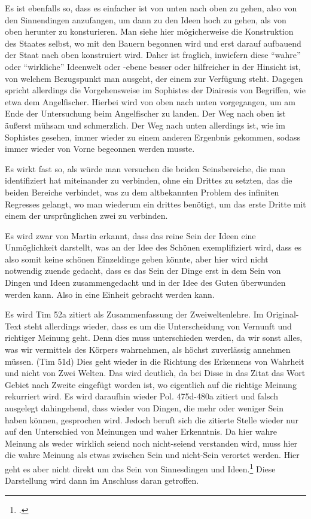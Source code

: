 Es ist ebenfalls so, dass es einfacher ist von unten nach oben zu gehen, also von den Sinnendingen anzufangen, um dann zu den Ideen hoch zu gehen, als von oben herunter zu konsturieren. Man siehe hier mögicherweise die Konstruktion des Staates selbst, wo mit den Bauern begonnen wird und erst darauf aufbauend der Staat nach oben konstruiert wird. Daher ist fraglich, inwiefern diese \enquote{wahre} oder \enquote{wirkliche} Ideenwelt oder -ebene besser oder hilfreicher in der Hinsicht ist, von welchem Bezugspunkt man ausgeht, der einem zur Verfügung steht. Dagegen spricht allerdings die Vorgehensweise im Sophistes der Diairesis von Begriffen, wie etwa dem Angelfischer. Hierbei wird von oben nach unten vorgegangen, um am Ende der Untersuchung beim Angelfischer zu landen. Der Weg nach oben ist äußerst mühsam und schmerzlich. Der Weg nach unten allerdings ist, wie im Sophistes gesehen, immer wieder zu einem anderen Ergenbnis gekommen, sodass immer wieder von Vorne begeonnen werden musste.

Es  wirkt fast so, als würde man versuchen die beiden Seinsbereiche, die man identifiziert hat miteinander zu verbinden, ohne ein Drittes zu setzten, das die beiden Bereiche verbindet, was zu dem altbekannten Problem des infiniten Regresses gelangt, wo man wiederum ein drittes benötigt, um das erste Dritte mit einem der ursprünglichen zwei zu verbinden.

Es wird zwar von Martin erkannt, dass das reine Sein der Ideen eine Unmöglichkeit darstellt, was an der Idee des Schönen exemplifiziert wird, dass es also somit keine schönen Einzeldinge geben könnte, aber hier wird nicht notwendig zuende gedacht, dass es das Sein der Dinge erst in dem Sein von Dingen und Ideen zusammengedacht und in der Idee des Guten überwunden werden kann. Also in eine Einheit gebracht werden kann. 

Es wird Tim 52a zitiert als Zusammenfassung der Zweiweltenlehre. Im Original-Text steht allerdings wieder, dass es um die Unterscheidung von Vernunft und richtiger Meinung geht. Denn dies muss unterschieden werden, da wir sonst alles, was wir vermittels des Körpers wahrnehmen, als höchst zuverlässig annehmen müssen. (Tim 51d) Dies geht wieder in die Richtung des Erkennens von Wahrheit und nicht von Zwei Welten. Das wird deutlich, da bei Disse in das Zitat das Wort Gebiet nach Zweite eingefügt worden ist, wo eigentlich auf die richtige Meinung rekurriert wird.
Es wird daraufhin wieder Pol. 475d-480a zitiert und falsch ausgelegt dahingehend, dass wieder von Dingen, die mehr oder weniger Sein haben können, gesprochen wird. Jedoch beruft sich die zitierte Stelle wieder nur auf den Unterschied von Meinungen und waher Erkenntnis. Da hier wahre Meinung als weder wirklich seiend noch nicht-seiend verstanden wird, muss hier die wahre Meinung als etwas zwischen Sein und nicht-Sein verortet werden. Hier geht es aber nicht direkt um das Sein von Sinnesdingen und Ideen.\footcite[vgl.][S. 37f.]{DisseMetaphysik} Diese Darstellung wird dann im Anschluss daran getroffen.

